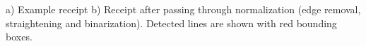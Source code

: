 \label{fig:receipts}
a) Example receipt b) Receipt after passing through normalization (edge removal, straightening and binarization). Detected lines are shown with red bounding boxes. 
